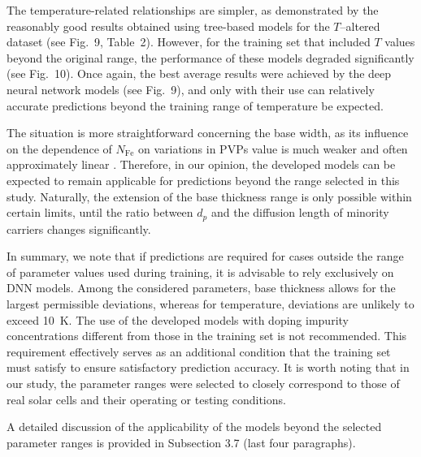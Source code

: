 \documentclass[a4paper,fleqn]{cas-sc}
\begin{document}
The temperature-related relationships are simpler, as demonstrated by the reasonably good results
obtained using tree-based models for the $T$--altered dataset (see Fig.~9, Table~2).
However, for the training set that included $T$ values beyond the original range,
the performance of these models degraded significantly (see Fig.~10).
Once again, the best average results were achieved by the deep neural network models (see Fig.~9),
and only with their use can relatively accurate predictions beyond the training range of temperature be expected.

The situation is more straightforward concerning the base width,
as its influence on the dependence of $N_\mathrm{Fe}$ on variations in PVPs value is much weaker and often approximately linear \cite{Olikh2025MSEB}.
Therefore, in our opinion, the developed models can be expected to remain applicable
for predictions beyond the range selected in this study.
Naturally, the extension of the base thickness range is only possible within certain limits,
until the ratio between $d_p$ and the diffusion length of minority carriers changes significantly.

In summary, we note that if predictions are required for cases outside the range of parameter values used during training,
it is advisable to rely exclusively on DNN models.
Among the considered parameters, base thickness allows for the largest permissible deviations,
whereas for temperature, deviations are unlikely to exceed 10~K.
The use of the developed models with doping impurity concentrations different
from those in the training set is not recommended.
This requirement effectively serves as an additional condition that the training set must satisfy
to ensure satisfactory prediction accuracy.
It is worth noting that in our study, the parameter ranges were selected to closely correspond
to those of real solar cells and their operating or testing conditions.

A detailed discussion of the applicability of the models beyond the selected parameter ranges is provided in Subsection 3.7 (last four paragraphs).
\end{document}

